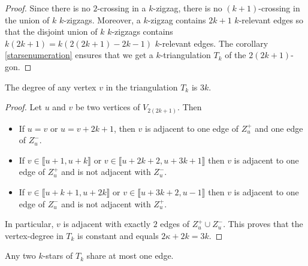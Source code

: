 \documentclass[12pt]{amsart}
\begin{document}
\begin{proof}
Since there is no $2$-crossing in a $k$-zigzag, there is no $(k+1)$-crossing in the union of $k$ $k$-zigzags. Moreover, a $k$-zigzag contains $2k+1$ $k$-relevant edges so that the disjoint union of $k$ $k$-zigzags contains $k(2k+1)=k(2(2k+1)-2k-1)$ $k$-relevant edges. The corollary \ref{starsenumeration} ensures that we get a $k$-triangulation $T_k$ of the $2(2k+1)$-gon.
\end{proof}

\begin{lemma}
The degree of any vertex $v$ in the triangulation $T_k$ is $3k$.
\end{lemma}

\begin{proof}
Let $u$ and $v$ be two vertices of $V_{2(2k+1)}$. Then
\begin{itemize}
\item If $u=v$ or $u=v+2k+1$, then $v$ is adjacent to one edge of $Z_u^+$ and one edge of $Z_u^-$.
\item If $v\in\llbracket u+1,u+k\rrbracket$ or $v\in\llbracket u+2k+2,u+3k+1\rrbracket$ then $v$ is adjacent to one edge of $Z_u^+$ and is not adjacent with $Z_u^-$.
\item If $v\in\llbracket u+k+1,u+2k\rrbracket$ or $v\in\llbracket u+3k+2,u-1\rrbracket$ then $v$ is adjacent to one edge of $Z_u^-$ and is not adjacent with $Z_u^+$.
\end{itemize}
In particular, $v$ is adjacent with exactly $2$ edges of $Z_u^+\cup Z_u^-$. This proves that the vertex-degree in $T_k$ is constant and equals $2\kappa+2k=3k$.
\end{proof}

\begin{lemma}
Any two $k$-stars of $T_k$ share at most one edge.
\end{lemma}
\end{document}
